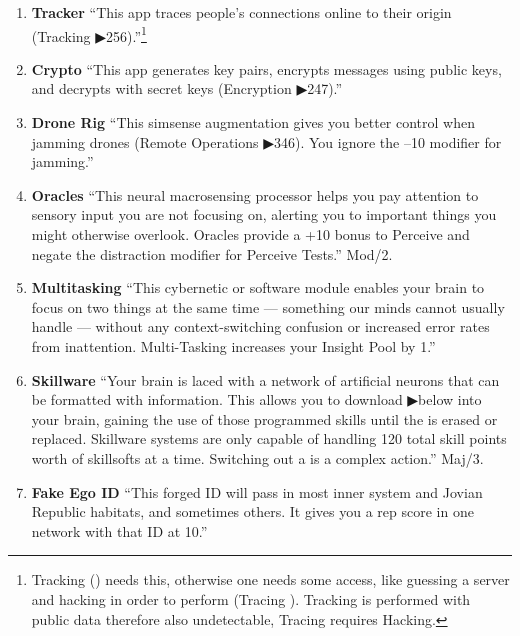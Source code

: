 \begin{enumerate}
    \item \textbf{\gls{Tracker}} “This app traces people’s connections online to their origin (Tracking ▶256).”\footnote{Tracking (\citep[pg. 256]{ep2e_1.1_2019}) needs this, otherwise one needs some access, like guessing a server and hacking in order to perform (Tracing \citep[pg. 249]{ep2e_1.1_2019}). Tracking is performed with public data therefore also undetectable, Tracing requires Hacking.} \citep[pg. 326]{ep2e_1.1_2019}

    \item \textbf{\gls{Crypto}} “This app generates key pairs, encrypts messages using
    public keys, and decrypts with secret keys (Encryption ▶247).” \citep[pg. 326]{ep2e_1.1_2019}

    \item \textbf{\gls{Drone Rig}} “This simsense augmentation gives you better control when jamming drones (Remote Operations ▶346). You ignore the –10 modifier for jamming.” \citep[pg. 320]{ep2e_1.1_2019}

    \item \textbf{\gls{Oracles}} “This neural macrosensing processor helps you pay attention to sensory input you are not focusing on, alerting you to important things you might otherwise overlook. Oracles provide a +10 bonus to Perceive and negate the distraction modifier for Perceive Tests.” \citep[pg. 319]{ep2e_1.1_2019}  Mod/2.

    \item \textbf{Multitasking} “This cybernetic or software module enables your brain to focus on two things at the same time — something our minds cannot usually handle — without any context-switching confusion or increased error rates from inattention. Multi-Tasking increases your Insight Pool by 1.” \citep[pg. 320]{ep2e_1.1_2019}

    \item \textbf{\gls{Skillware}} “Your brain is laced with a network of artificial neurons that can be formatted with information. This allows you to download  ▶below into your brain, gaining the use of those programmed skills until the  is erased or replaced. Skillware systems are only capable of handling 120 total skill points worth of skillsofts at a time. Switching out a  is a complex action.” \citep[pg. 320]{ep2e_1.1_2019}  Maj/3.

    \item \textbf{\gls{Fake Ego ID}} “This forged ID will pass in most inner system and Jovian Republic habitats, and sometimes others. It gives you a rep score in one network with that ID at 10.” \citep[pg. 315]{ep2e_1.1_2019}


\end{enumerate}
